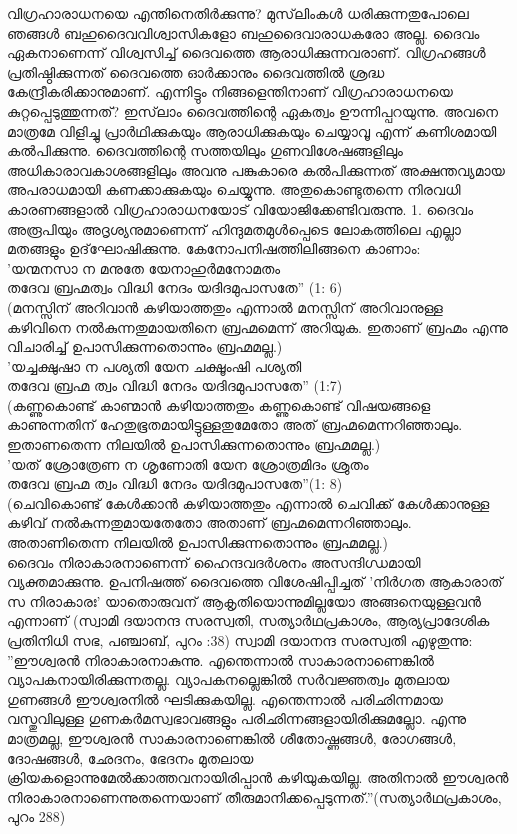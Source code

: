 വിഗ്രഹാരാധനയെ എന്തിനെതിര്‍ക്കുന്നു? 
  മുസ്‌ലിംകള്‍ ധരിക്കുന്നതുപോലെ ഞങ്ങള്‍ ബഹുദൈവവിശ്വാസികളോ ബഹുദൈവാരാധകരോ അല്ല. ദൈവം ഏകനാണെന്ന് വിശ്വസിച്ച് ദൈവത്തെ ആരാധിക്കുന്നവരാണ്. വിഗ്രഹങ്ങള്‍ പ്രതിഷ്ഠിക്കുന്നത് ദൈവത്തെ ഓര്‍ക്കാനും ദൈവത്തില്‍ ശ്രദ്ധ കേന്ദ്രീകരിക്കാനുമാണ്. എന്നിട്ടും നിങ്ങളെന്തിനാണ് വിഗ്രഹാരാധനയെ കുറ്റപ്പെടുത്തുന്നത്?
 ഇസ്‌ലാം ദൈവത്തിന്റെ ഏകത്വം ഊന്നിപ്പറയുന്നു. അവനെ മാത്രമേ വിളിച്ചു പ്രാര്‍ഥിക്കുകയും ആരാധിക്കുകയും ചെയ്യാവൂ എന്ന് കണിശമായി കല്‍പിക്കുന്നു. ദൈവത്തിന്റെ സത്തയിലും ഗുണവിശേഷങ്ങളിലും അധികാരാവകാശങ്ങളിലും അവനു പങ്കുകാരെ കല്‍പിക്കുന്നത് അക്ഷന്തവ്യമായ അപരാധമായി കണക്കാക്കുകയും ചെയ്യുന്നു. അതുകൊണ്ടുതന്നെ നിരവധി കാരണങ്ങളാല്‍ വിഗ്രഹാരാധനയോട് വിയോജിക്കേണ്ടിവരുന്നു.
1. ദൈവം അരൂപിയും അദൃശ്യനുമാണെന്ന് ഹിന്ദുമതമുള്‍പ്പെടെ ലോകത്തിലെ എല്ലാ മതങ്ങളും ഉദ്‌ഘോഷിക്കുന്നു.
കേനോപനിഷത്തിലിങ്ങനെ കാണാം:\\
'യന്മനസാ ന മനുതേ യേനാഹുര്‍മനോമതം\\
തദേവ ബ്രഹ്മത്വം വിദ്ധി നേദം യദിദമുപാസതേ'' (1: 6)\\
(മനസ്സിന് അറിവാന്‍ കഴിയാത്തതും എന്നാല്‍ മനസ്സിന് അറിവാനുള്ള കഴിവിനെ നല്‍കുന്നതുമായതിനെ ബ്രഹ്മമെന്ന് അറിയുക. ഇതാണ് ബ്രഹ്മം എന്നു വിചാരിച്ച് ഉപാസിക്കുന്നതൊന്നും ബ്രഹ്മമല്ല.)\\
'യച്ചക്ഷുഷാ ന പശ്യതി യേന ചക്ഷൂംഷി പശ്യതി\\
തദേവ ബ്രഹ്മ ത്വം വിദ്ധി നേദം യദിദമുപാസതേ'' (1:7)\\
(കണ്ണുകൊണ്ട് കാണ്മാന്‍ കഴിയാത്തതും കണ്ണുകൊണ്ട് വിഷയങ്ങളെ കാണുന്നതിന് ഹേതുഭൂതമായിട്ടുള്ളതുമേതോ അത് ബ്രഹ്മമെന്നറിഞ്ഞാലും. ഇതാണതെന്ന നിലയില്‍ ഉപാസിക്കുന്നതൊന്നും ബ്രഹ്മമല്ല.)\\
'യത് ശ്രോത്രേണ ന ശൃണോതി യേന ശ്രോത്രമിദം ശ്രുതം\\
തദേവ ബ്രഹ്മ ത്വം വിദ്ധി നേദം യദിദമുപാസതേ''(1: 8)\\
(ചെവികൊണ്ട് കേള്‍ക്കാന്‍ കഴിയാത്തതും എന്നാല്‍ ചെവിക്ക് കേള്‍ക്കാനുള്ള കഴിവ് നല്‍കുന്നതുമായതേതോ അതാണ് ബ്രഹ്മമെന്നറിഞ്ഞാലും. അതാണിതെന്ന നിലയില്‍ ഉപാസിക്കുന്നതൊന്നും ബ്രഹ്മമല്ല.)\\
ദൈവം നിരാകാരനാണെന്ന് ഹൈന്ദവദര്‍ശനം അസന്ദിഗ്ധമായി വ്യക്തമാക്കുന്നു. ഉപനിഷത്ത് ദൈവത്തെ വിശേഷിപ്പിച്ചത് 'നിര്‍ഗത ആകാരാത് സ നിരാകാരഃ' യാതൊരുവന് ആകൃതിയൊന്നുമില്ലയോ അങ്ങനെയുള്ളവന്‍ എന്നാണ് (സ്വാമി ദയാനന്ദ സരസ്വതി, സത്യാര്‍ഥപ്രകാശം, ആര്യപ്രാദേശിക പ്രതിനിധി സഭ, പഞ്ചാബ്, പുറം :38)
സ്വാമി ദയാനന്ദ സരസ്വതി എഴുതുന്നു: ''ഈശ്വരന്‍ നിരാകാരനാകുന്നു. എന്തെന്നാല്‍ സാകാരനാണെങ്കില്‍ വ്യാപകനായിരിക്കുന്നതല്ല. വ്യാപകനല്ലെങ്കില്‍ സര്‍വജ്ഞത്വം മുതലായ ഗുണങ്ങള്‍ ഈശ്വരനില്‍ ഘടിക്കുകയില്ല. എന്തെന്നാല്‍ പരിഛിന്നമായ വസ്തുവിലുള്ള ഗുണകര്‍മസ്വഭാവങ്ങളും പരിഛിന്നങ്ങളായിരിക്കുമല്ലോ. എന്നു മാത്രമല്ല, ഈശ്വരന്‍ സാകാരനാണെങ്കില്‍ ശീതോഷ്ണങ്ങള്‍, രോഗങ്ങള്‍, ദോഷങ്ങള്‍, ഛേദനം, ഭേദനം മുതലായ ക്രിയകളൊന്നുമേല്‍ക്കാത്തവനായിരിപ്പാന്‍ കഴിയുകയില്ല. അതിനാല്‍ ഈശ്വരന്‍ നിരാകാരനാണെന്നുതന്നെയാണ് തീരുമാനിക്കപ്പെടുന്നത്.''(സത്യാര്‍ഥപ്രകാശം, പുറം 288)
